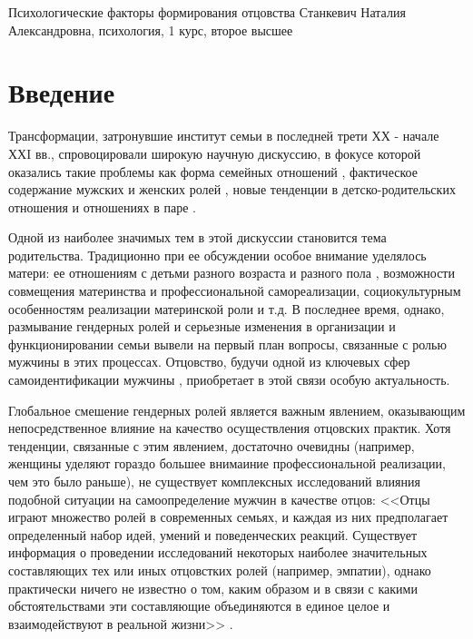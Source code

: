 \documentclass{../../common/thesisbyxetex}
\begin{document}
 
 Психологические факторы формирования отцовства
Станкевич Наталия Александровна,
психология, 1 курс, второе высшее



\section*{Введение} 

Трансформации, затронувшие институт семьи в последней трети ХХ - начале ХХI вв.,  спровоцировали
широкую научную дискуссию, в фокусе которой оказались такие проблемы как форма семейных
отношений \cite{gay, legfat}, фактическое содержание мужских и женских ролей \cite{mercoh, percep},
новые тенденции в детско-родительских отношения и отношениях в паре \cite{relot, sex}.

Одной из наиболее значимых тем в этой дискуссии становится тема родительства. Традиционно при ее
обсуждении особое внимание уделялось матери: ее отношениям с детьми разного возраста и разного
пола \cite{maler}, возможности совмещения материнства и профессиональной самореализации,
социокультурным особенностям реализации материнской роли и т.д. В последнее время, однако,
размывание гендерных ролей и серьезные изменения в организации и функционировании семьи
вывели на первый план вопросы, связанные с ролью мужчины в этих процессах. Отцовство, будучи одной
из ключевых сфер самоидентификации мужчины \cite{imaf}, приобретает в этой связи особую
актуальность.

Глобальное смешение гендерных ролей является  важным явлением, оказывающим
непосредственное влияние на качество осуществления отцовских практик. Хотя тенденции, связанные
с этим явлением, достаточно очевидны (например, женщины уделяют гораздо большее внимаиние
профессиональной реализации, чем это было раньше), не существует комплексных исследований
влияния подобной ситуации на самоопределение мужчин в качестве отцов: <<Отцы играют множество
ролей в современных семьях, и каждая из них предполагает определенный набор идей, умений и
поведенческих реакций. Существует информация о проведении исследований некоторых наиболее
значительных составляющих тех или иных отцовстких ролей (например, эмпатии), однако
практически ничего не известно о том, каким образом и в связи с какими обстоятельствами эти
составляющие объединяются в единое целое и взаимодействуют в реальной жизни>>
 \cite[131]{f21}.
\end{document}
